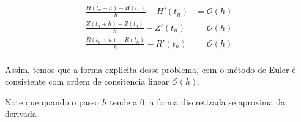 \documentclass[a4paper, 11pt]{article}
\begin{document}

\begin{align*}
    \frac{H(t_n + h) - H(t_n)}{h} - H'(t_n) &=  \mathcal{O}(h)\\
    \frac{Z(t_n + h) - Z(t_n)}{h} - Z'(t_n) &= \mathcal{O}(h)\\
    \frac{R(t_n + h) - R(t_n)}{h} - R'(t_n) &=  \mathcal{O}(h)\\
\end{align*}

Assim, temos que a forma explicita desse problema, com o método de Euler é consistente com ordem de consitencia linear $\mathcal O (h)$.

Note que quando o passo $h$ tende a 0, a forma discretizada se aproxima da derivada
\end{document}

